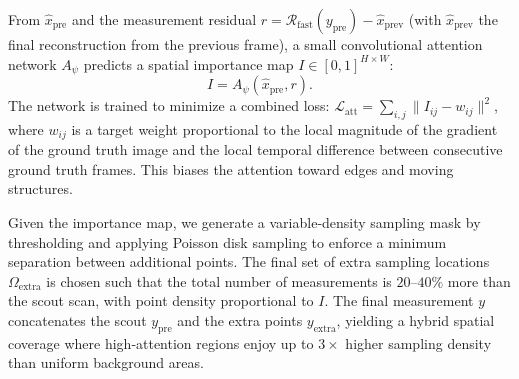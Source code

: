 \documentclass{article}
\begin{document}
From $\hat{x}_{\mathrm{pre}}$ and the measurement residual $r = \mathcal{R}_{\mathrm{fast}}(y_{\mathrm{pre}}) - \hat{x}_{\mathrm{prev}}$ (with $\hat{x}_{\mathrm{prev}}$ the final reconstruction from the previous frame), a small convolutional attention network $A_\psi$ predicts a spatial importance map $I \in [0,1]^{H \times W}$:
\begin{equation}
I = A_\psi(\hat{x}_{\mathrm{pre}}, r).
\end{equation}
The network is trained to minimize a combined loss: $\mathcal{L}_{\mathrm{att}} = \sum_{i,j} \|I_{ij} - w_{ij}\|^2$, where $w_{ij}$ is a target weight proportional to the local magnitude of the gradient of the ground truth image and the local temporal difference between consecutive ground truth frames. This biases the attention toward edges and moving structures.

Given the importance map, we generate a variable‑density sampling mask by thresholding and applying Poisson disk sampling to enforce a minimum separation between additional points. The final set of extra sampling locations $\Omega_{\mathrm{extra}}$ is chosen such that the total number of measurements is $20$–$40\%$ more than the scout scan, with point density proportional to $I$. The final measurement $y$ concatenates the scout $y_{\mathrm{pre}}$ and the extra points $y_{\mathrm{extra}}$, yielding a hybrid spatial coverage where high‑attention regions enjoy up to $3\times$ higher sampling density than uniform background areas.
\end{document}
